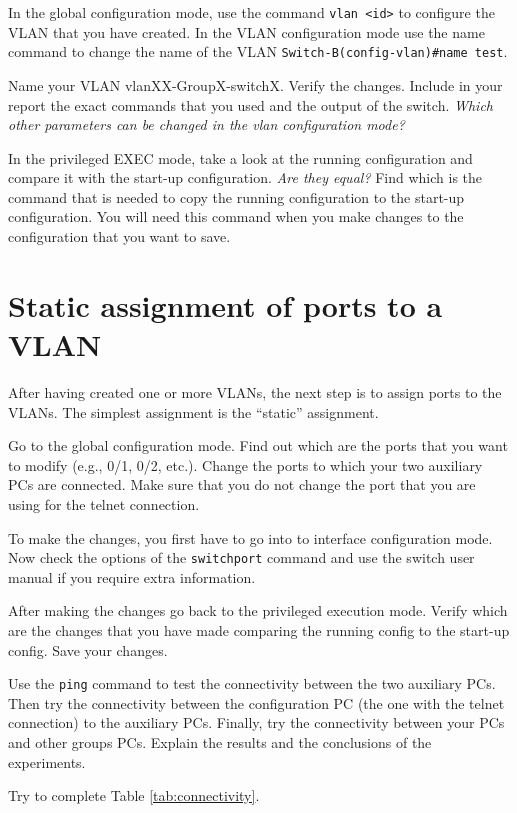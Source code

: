 In the global configuration mode, use the command \texttt{vlan <id>} to configure the VLAN that you have created.
In the VLAN configuration mode use the name command to change the name of the VLAN \texttt{Switch-B(config-vlan)\#name test}.

Name your VLAN vlanXX-GroupX-switchX.
Verify the changes.
Include in your report the exact commands that you used and the output of the switch.
\emph{Which other parameters can be changed in the vlan configuration mode?}

In the privileged EXEC mode, take a look at the running configuration and compare it with the start-up configuration.
\emph{Are they equal?}
Find which is the command that is needed to copy the running configuration to the start-up configuration.
You will need this command when you make changes to the configuration that you want to save.

\section{Static assignment of ports to a VLAN}
\label{sec:static}

After having created one or more VLANs, the next step is to assign ports to the VLANs.
The simplest assignment is the ``static'' assignment.

Go to the global configuration mode.
Find out which are the ports that you want to modify (e.g., 0/1, 0/2, etc.).
Change the ports to which your two auxiliary PCs are connected.
Make sure that you do not change the port that you are using for the telnet connection.

To make the changes, you first have to go into to interface configuration mode.
Now check the options of the \texttt{switchport} command and use the switch user manual if you require extra information.

After making the changes go back to the privileged execution mode.
Verify which are the changes that you have made comparing the running config to the start-up config.
Save your changes.

Use the \texttt{ping} command to test the connectivity between the two auxiliary PCs.
Then try the connectivity between the configuration PC (the one with the telnet connection) to the auxiliary PCs.
Finally, try the connectivity between your PCs and other groups PCs.
Explain the results and the conclusions of the experiments.

Try to complete Table \ref{tab:connectivity}.

